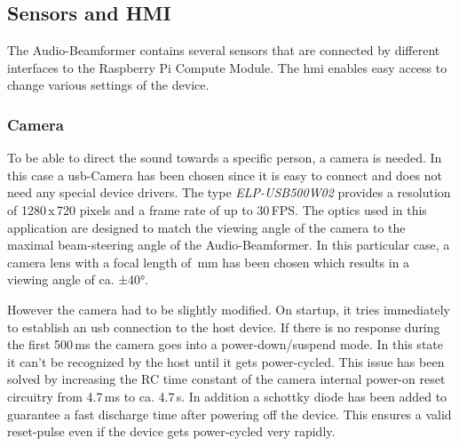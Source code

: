 \subsection{Sensors and HMI}
The Audio-Beamformer contains several sensors that are connected by different interfaces to the Raspberry Pi Compute Module. The \acrfull{hmi} enables easy access to change various settings of the device.

\subsubsection{Camera}
To be able to direct the sound towards a specific person, a camera is needed. In this case a \acrshort{usb}-Camera has been chosen since it is easy to connect and does not need any special device drivers. The type \textit{ELP-USB500W02} provides a resolution of 1280\,x\,720 pixels and a frame rate of up to 30\,FPS. The optics used in this application are designed to match the viewing angle of the camera to the maximal beam-steering angle of the Audio-Beamformer. In this particular case, a camera lens with a focal length of \,mm has been chosen which results in a viewing angle of ca. ±40°.

However the camera had to be slightly modified. On startup, it tries immediately to establish an \acrshort{usb} connection to the host device. If there is no response during the first 500\,ms the camera goes into a power-down/suspend mode. In this state it can't be recognized by the host until it gets power-cycled. This issue has been solved by increasing the RC time constant of the camera internal power-on reset circuitry from 4.7\,ms to ca. 4.7\,s. In addition a schottky diode has been added to guarantee a fast discharge time after powering off the device. This ensures a valid reset-pulse even if the device gets power-cycled very rapidly.

